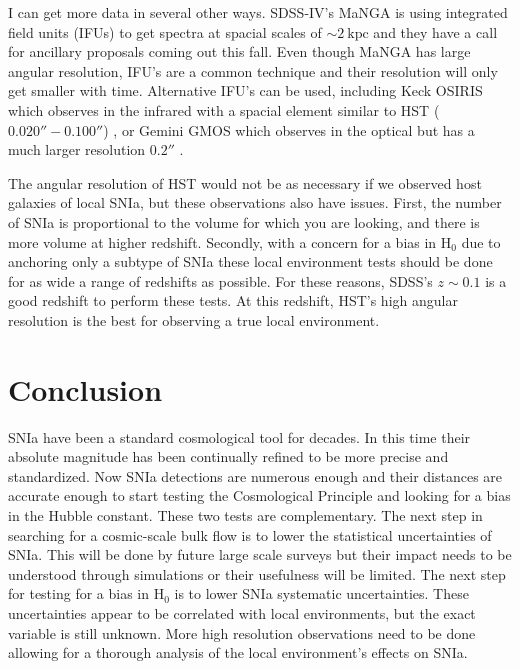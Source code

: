 \documentclass[apj, iop]{emulateapj}
\newcommand{\sn}{SNIa}
\newcommand{\Hubble}{\ensuremath{\text{H}_0}}
\begin{document}
I can get more data in several other ways. SDSS-IV's MaNGA is using integrated
field units (IFUs) to get spectra at spacial scales of $\sim 2 ~\text{kpc}$ and
they have a call for ancillary proposals coming out this fall. Even though MaNGA
has large angular resolution, IFU's are a common technique and their resolution
will only get smaller with time. Alternative IFU's can be used, including Keck
OSIRIS which observes in the infrared with a spacial element similar to HST
($0.020'' - 0.100''$) \citep{OSIRIS},
or Gemini GMOS which observes in the optical but has a much larger resolution
$0.2''$ \citep{Gemini}.

The angular resolution of HST would not be as necessary if we observed host
galaxies of local \sn{}, but these observations also have issues. First, the
number of \sn{} is proportional to the volume for which you are looking, and
there is more volume at higher redshift. Secondly,
with a concern for a bias in \Hubble{} due to anchoring only a subtype of \sn{} 
these local environment tests should be done for
as wide a range of redshifts as possible. For these reasons, SDSS's $z \sim 0.1$
is a good redshift to perform these tests. At this redshift, HST's high angular
resolution is the best for observing a true local environment.

\section{Conclusion}

\sn{} have been a standard cosmological tool for decades. In this time their
absolute magnitude has been continually refined to be more precise and
standardized. Now \sn{} detections are numerous enough and their distances are
accurate enough to start testing the Cosmological Principle and looking for a
bias in the Hubble constant. These two tests are complementary.  The next
step in searching for a cosmic-scale bulk flow is to lower the statistical
uncertainties of \sn{}. This will be done by future large scale surveys but
their impact needs to be understood through simulations or their usefulness will
be limited.  The next step for testing for a bias in \Hubble{} is to lower \sn{}
systematic uncertainties. These uncertainties appear to be correlated with local
environments, but the exact variable is still unknown. More high resolution
observations need to be done allowing for a thorough analysis of the local
environment's effects on \sn{}.





\end{document}

